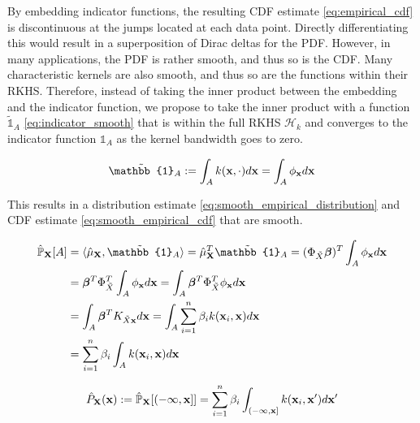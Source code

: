 \documentclass[twoside]{article} \usepackage{aistats2017}
\theoremstyle{definition}
\newcommand{\rv}[1]{{#1}}
\newcommand{\ds}[1]{\tilde{#1}}
\begin{document}
		By embedding indicator functions, the resulting CDF estimate \eqref{eq:empirical_cdf} is discontinuous at the jumps located at each data point. Directly differentiating this would result in a superposition of Dirac deltas for the PDF. However, in many applications, the PDF is rather smooth, and thus so is the CDF. Many characteristic kernels are also smooth, and thus so are the functions within their RKHS. Therefore, instead of taking the inner product between the embedding and the indicator function, we propose to take the inner product with a function $\tilde{\mathbb{1}}_{A}$ \eqref{eq:indicator_smooth} that is within the full RKHS $\mathcal{H}_{k}$ and converges to the indicator function $\mathbb{1}_{A}$ as the kernel bandwidth goes to zero.
		
		\begin{equation}
			\tilde{\mathbb{1}}_{A} := \int_{A} k(\bvec{x}, \cdot) d\bvec{x} = \int_{A} \phi_{\bvec{x}} d\bvec{x}
		\label{eq:indicator_smooth}
		\end{equation}
		
		This results in a distribution estimate \eqref{eq:smooth_empirical_distribution} and CDF estimate \eqref{eq:smooth_empirical_cdf} that are smooth.

		\begin{equation}
		\begin{aligned}
			\hat{\mathbb{P}}_{\bvec{\rv{X}}}[A] &= \langle \hat{\mu}_{\bvec{\rv{X}}}, \tilde{\mathbb{1}}_{A} \rangle = \hat{\mu}_{\bvec{\rv{X}}}^{T} \tilde{\mathbb{1}}_{A} = (\Phi_{\ds{X}} \bm{\beta})^{T} \int_{A} \phi_{\bvec{x}} d\bvec{x} \\
			&= \bm{\beta}^{T} \Phi_{\ds{X}}^{T} \int_{A} \phi_{\bvec{x}} d\bvec{x} = \int_{A} \bm{\beta}^{T} \Phi_{\ds{X}}^{T} \phi_{\bvec{x}} d\bvec{x} \\
			&= \int_{A} \bm{\beta}^{T} K_{\ds{X} \bvec{x}} d\bvec{x} = \int_{A} \sum_{i = 1}^{n} \beta_{i} k(\bvec{x}_{i}, \bvec{x}) d\bvec{x} \\
			&= \sum_{i = 1}^{n} \beta_{i} \int_{A}  k(\bvec{x}_{i}, \bvec{x}) d\bvec{x} \\
		\end{aligned}
		\label{eq:smooth_empirical_distribution}
		\end{equation}	
		
		\begin{equation}
			\hat{P}_{\bvec{\rv{X}}}(\bvec{x}) := \hat{\mathbb{P}}_{\bvec{\rv{X}}}[(-\bvec{\infty}, \bvec{x}]] = \sum_{i = 1}^{n} \beta_{i} \int_{(-\bvec{\infty}, \bvec{x}]}  k(\bvec{x}_{i}, \bvec{x}') d\bvec{x}'
		\label{eq:smooth_empirical_cdf}
		\end{equation}
		
\end{document}

